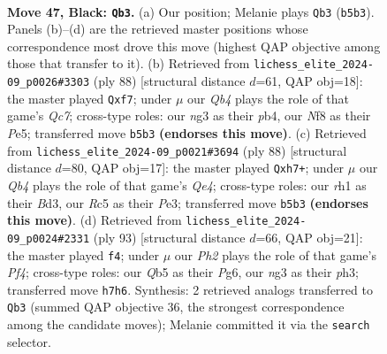 \documentclass[11pt]{article}
\begin{document}
\clearpage

\begin{figure}[p]\centering
\begin{subfigure}{0.46\textwidth}\centering
\resizebox{\linewidth}{!}{%
\newchessgame
\chessboard[
  setfen={5nk1/1p2Q2p/8/1qr4p/8/6N1/R5K1/7R b - - 7 47},
  showmover=false,
  pgfstyle=straightmove, color=movearrow, markmove={b5-b3}
]}
\caption{}
\end{subfigure}\hfill
\begin{subfigure}{0.46\textwidth}\centering
\resizebox{\linewidth}{!}{%
\newchessgame
\chessboard[
  setfen={6rk/2Q2p1p/8/4P3/1p6/4q2P/5RPK/8 w - - 1 45},
  showmover=false,
  pgfstyle=straightmove, color=movearrow, markmove={c7-f7}
]}
\caption{}
\end{subfigure}
\\[4pt]
\begin{subfigure}{0.46\textwidth}\centering
\resizebox{\linewidth}{!}{%
\newchessgame
\chessboard[
  setfen={5rk1/6bp/8/1P6/4Q3/3BP1PK/5q1P/8 w - - 2 45},
  showmover=false,
  pgfstyle=straightmove, color=movearrow, markmove={e4-h7}
]}
\caption{}
\end{subfigure}\hfill
\begin{subfigure}{0.46\textwidth}\centering
\resizebox{\linewidth}{!}{%
\newchessgame
\chessboard[
  setfen={4r1k1/3Q2np/3R2p1/1p3p2/8/7P/6K1/8 b - - 4 47},
  showmover=false,
  pgfstyle=straightmove, color=movearrow, markmove={f5-f4}
]}
\caption{}
\end{subfigure}
\caption{\textbf{Move 47, Black: \texttt{Qb3}.} (a) Our position; Melanie plays \texttt{Qb3} (\texttt{b5b3}). Panels (b)--(d) are the retrieved master positions whose correspondence most drove this move (highest QAP objective among those that transfer to it). (b) Retrieved from \texttt{lichess\_elite\_2024-09\_p0026\#3303} (ply 88) [structural distance $d$=61, QAP obj=18]: the master played \texttt{Qxf7}; under $\mu$ our \emph{Qb4} plays the role of that game's \emph{Qc7}; cross-type roles: our \emph{n}g3 as their \emph{p}b4, our \emph{N}f8 as their \emph{P}e5; transferred move \texttt{b5b3} \textbf{(endorses this move)}. (c) Retrieved from \texttt{lichess\_elite\_2024-09\_p0021\#3694} (ply 88) [structural distance $d$=80, QAP obj=17]: the master played \texttt{Qxh7+}; under $\mu$ our \emph{Qb4} plays the role of that game's \emph{Qe4}; cross-type roles: our \emph{r}h1 as their \emph{B}d3, our \emph{R}c5 as their \emph{P}e3; transferred move \texttt{b5b3} \textbf{(endorses this move)}. (d) Retrieved from \texttt{lichess\_elite\_2024-09\_p0024\#2331} (ply 93) [structural distance $d$=66, QAP obj=21]: the master played \texttt{f4}; under $\mu$ our \emph{Ph2} plays the role of that game's \emph{Pf4}; cross-type roles: our \emph{Q}b5 as their \emph{P}g6, our \emph{n}g3 as their \emph{p}h3; transferred move \texttt{h7h6}. Synthesis: 2 retrieved analogs transferred to \texttt{Qb3} (summed QAP objective 36, the strongest correspondence among the candidate moves); Melanie committed it via the \texttt{search} selector.}
\label{fig:thought-m93}
\end{figure}
\end{document}
